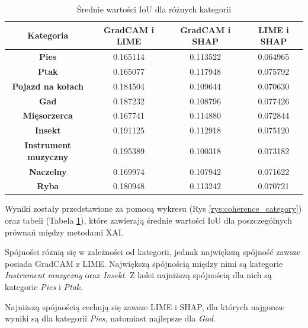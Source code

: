 \begin{table}[h]
	\centering
	\begin{tabular}{|c|c|c|c|}
		\hline
		\textbf{Kategoria}           & \textbf{GradCAM i LIME} & \textbf{GradCAM i SHAP} & \textbf{LIME i SHAP} \\
		\hline
		\textbf{Pies}                & 0.165114                & 0.113522                & 0.064965             \\
		\hline
		\textbf{Ptak}                & 0.165077                & 0.117948                & 0.075792             \\
		\hline
		\textbf{Pojazd na kołach}    & 0.184504                & 0.109644                & 0.070630             \\
		\hline
		\textbf{Gad}                 & 0.187232                & 0.108796                & 0.077426             \\
		\hline
		\textbf{Mięsorzerca}         & 0.167741                & 0.114880                & 0.072844             \\
		\hline
		\textbf{Insekt}              & 0.191125                & 0.112918                & 0.075120             \\
		\hline
		\textbf{Instrument muzyczny} & 0.195389                & 0.100318                & 0.073182             \\
		\hline
		\textbf{Naczelny}            & 0.169974                & 0.107942                & 0.071622             \\
		\hline
		\textbf{Ryba}                & 0.180948                & 0.113242                & 0.070721             \\
		\hline
	\end{tabular}
	\caption{Średnie wartości IoU dla różnych kategorii}
	\label{tab:base_coherence_categories}
\end{table}

Wyniki zostały przedstawione za pomocą wykresu (Rys \ref{rys:coherence_category}) oraz tabeli (Tabela \ref{tab:base_coherence_categories}), które zawierają średnie wartości IoU dla poszczególnych prównań między metodami XAI.

Spójności różnią się w zależności od kategorii, jednak największą spójność zawsze posiada GradCAM z LIME.
Największą spójnością między nimi są kategorie \textit{Instrument muzyczny} oraz \textit{Insekt}.
Z kolei najniższą spójnością dla nich są kategorie \textit{Pies} i \textit{Ptak}.

Najniższą spójnością cechują się zawsze LIME i SHAP, dla których najgorsze wyniki są dla kategorii \textit{Pies}, natomiast najlepsze dla \textit{Gad}.


